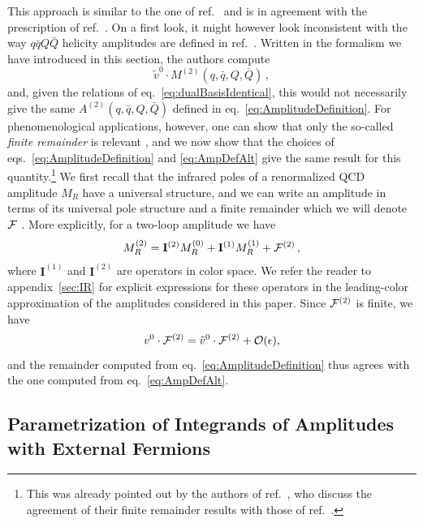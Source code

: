 This approach is similar to the one of
ref.~\cite{Glover:2004si} and is in
agreement with the prescription of ref.~\cite{Anger:2018ove}.
On a first look, it might however look inconsistent with the 
way $q\bar qQ\bar Q$ helicity amplitudes are defined in
ref.~\cite{DeFreitas:2004kmi}. Written in the formalism
we have introduced in this section, the authors compute
\begin{equation}
	\label{eq:AmpDefAlt}
	\tilde v^0\cdot M^{(2)}
	(q,\bar q,Q,\bar Q)\,,
\end{equation}
and, given the relations of eq.~\eqref{eq:dualBasisIdentical}, this
would not necessarily give the same 
$A^{(2)}(q,\bar q,Q,\bar Q)$ defined in 
eq.~\eqref{eq:AmplitudeDefinition}. For
phenomenological applications, however, 
one can show that only the
so-called \emph{finite remainder} is relevant 
\cite{Weinzierl:2011uz},
and we now show that the choices of 
eqs.~\eqref{eq:AmplitudeDefinition} and \eqref{eq:AmpDefAlt}
give the same result for this quantity.\footnote{This was 
already pointed out by the authors of 
ref.~\cite{DeFreitas:2004kmi}, who discuss the agreement of 
their finite remainder results with those of ref.~\cite{Glover:2004si}.}
We first recall that the infrared poles of a renormalized QCD
amplitude $M_R$ have a universal structure, and we can
write an amplitude in terms of its universal pole structure
and a finite remainder
which we will denote $\mathcal{F}$
\cite{Catani:1998bh,Sterman:2002qn,Becher:2009cu,Gardi:2009qi}.
More explicitly, 
for a two-loop amplitude we have
\begin{equation}\label{eq:remainderDef}
	M^{(2)}_R=
	\mathbf{I}^{(2)}M^{(0)}_R
	+\mathbf{I}^{(1)}M^{(1)}_R
	+\mathcal{F}^{(2)}\,,
\end{equation}
where $\mathbf{I}^{(1)}$ and $\mathbf{I}^{(2)}$ are operators in color
space. We refer the reader to appendix~\ref{sec:IR} for 
explicit expressions for these operators in the leading-color
approximation of the amplitudes considered in this paper. Since
$\mathcal{F}^{(2)}$ is finite, we have
\begin{equation}
	v^0\cdot \mathcal{F}^{(2)}
	=\tilde v^0\cdot \mathcal{F}^{(2)}+\mathcal{O}(\epsilon),
        \label{eq:RemainderEquivalence}
\end{equation}
and the remainder computed from 
eq.~\eqref{eq:AmplitudeDefinition} thus agrees with the 
one computed from eq.~\eqref{eq:AmpDefAlt}. 


\subsection{Parametrization of Integrands of Amplitudes with External Fermions}

